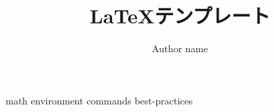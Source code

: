 \documentclass[a4paper,11pt]{ltjreport}
\title{\LaTeX テンプレート}
\author{Author name}
\date{\the\year}
\begin{document}
\maketitle
\tableofcontents

{math}
{environment}
{commands}
{best-practices}
\end{document}
